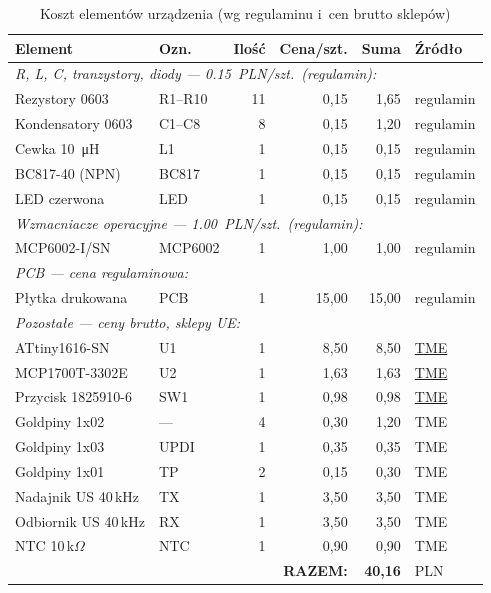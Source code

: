 \documentclass[a4paper,11pt]{article}
\begin{document}
\begin{table}[H]
    \centering
    \caption{Koszt elementów urządzenia (wg regulaminu i~cen brutto sklepów)}
    \label{tab:koszty}
    \begin{tabularx}{\textwidth}{l l r r r X}
        \toprule
        \textbf{Element} & \textbf{Ozn.} & \textbf{Ilość} &
        \textbf{Cena/szt.} & \textbf{Suma} & \textbf{Źródło} \\
        \midrule
        \multicolumn{6}{l}{\textit{R, L, C, tranzystory, diody --- \SI{0,15}{PLN}/szt.\ (regulamin):}} \\
        \midrule
        Rezystory 0603 & R1--R10 & 11 & 0,15 & 1,65 & regulamin \\
        Kondensatory 0603 & C1--C8 & 8 & 0,15 & 1,20 & regulamin \\
        Cewka \SI{10}{\micro\henry} & L1 & 1 & 0,15 & 0,15 & regulamin \\
        BC817-40 (NPN) & BC817 & 1 & 0,15 & 0,15 & regulamin \\
        LED czerwona & LED & 1 & 0,15 & 0,15 & regulamin \\
        \midrule
        \multicolumn{6}{l}{\textit{Wzmacniacze operacyjne --- \SI{1,00}{PLN}/szt.\ (regulamin):}} \\
        \midrule
        MCP6002-I/SN & MCP6002 & 1 & 1,00 & 1,00 & regulamin \\
        \midrule
        \multicolumn{6}{l}{\textit{PCB --- cena regulaminowa:}} \\
        \midrule
        Płytka drukowana & PCB & 1 & 15,00 & 15,00 & regulamin \\
        \midrule
        \multicolumn{6}{l}{\textit{Pozostałe --- ceny brutto, sklepy UE:}} \\
        \midrule
        ATtiny1616-SN & U1 & 1 & 8,50 & 8,50 &
            \href{https://www.tme.eu/pl/details/attiny1616-snr/mikrokontrolery-microchip-avr-8-bit/microchip-technology/}{TME} \\
        MCP1700T-3302E & U2 & 1 & 1,63 & 1,63 &
            \href{https://www.tme.eu/pl/details/mcp1700t-3302e_tt/stabilizatory-ldo-nienastawne/microchip-technology/}{TME} \\
        Przycisk 1825910-6 & SW1 & 1 & 0,98 & 0,98 &
            \href{https://www.tme.eu/pl/details/1825910-6/przelaczniki-tact/te-connectivity/}{TME} \\
        Goldpiny 1x02 & --- & 4 & 0,30 & 1,20 & TME \\
        Goldpiny 1x03 & UPDI & 1 & 0,35 & 0,35 & TME \\
        Goldpiny 1x01 & TP & 2 & 0,15 & 0,30 & TME \\
        Nadajnik US 40\,kHz & TX & 1 & 3,50 & 3,50 & TME \\
        Odbiornik US 40\,kHz & RX & 1 & 3,50 & 3,50 & TME \\
        NTC 10\,k$\Omega$ & NTC & 1 & 0,90 & 0,90 & TME \\
        \midrule
        \multicolumn{4}{r}{\textbf{RAZEM:}} & \textbf{40,16} & PLN \\
        \bottomrule
    \end{tabularx}
\end{table}
\end{document}
